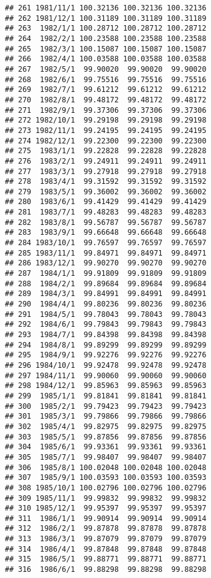 \documentclass[
]{article}
\begin{document}
\begin{verbatim}
## 261 1981/11/1 100.32136 100.32136 100.32136
## 262 1981/12/1 100.31189 100.31189 100.31189
## 263  1982/1/1 100.28712 100.28712 100.28712
## 264  1982/2/1 100.23588 100.23588 100.23588
## 265  1982/3/1 100.15087 100.15087 100.15087
## 266  1982/4/1 100.03588 100.03588 100.03588
## 267  1982/5/1  99.90020  99.90020  99.90020
## 268  1982/6/1  99.75516  99.75516  99.75516
## 269  1982/7/1  99.61212  99.61212  99.61212
## 270  1982/8/1  99.48172  99.48172  99.48172
## 271  1982/9/1  99.37306  99.37306  99.37306
## 272 1982/10/1  99.29198  99.29198  99.29198
## 273 1982/11/1  99.24195  99.24195  99.24195
## 274 1982/12/1  99.22300  99.22300  99.22300
## 275  1983/1/1  99.22828  99.22828  99.22828
## 276  1983/2/1  99.24911  99.24911  99.24911
## 277  1983/3/1  99.27918  99.27918  99.27918
## 278  1983/4/1  99.31592  99.31592  99.31592
## 279  1983/5/1  99.36002  99.36002  99.36002
## 280  1983/6/1  99.41429  99.41429  99.41429
## 281  1983/7/1  99.48283  99.48283  99.48283
## 282  1983/8/1  99.56787  99.56787  99.56787
## 283  1983/9/1  99.66648  99.66648  99.66648
## 284 1983/10/1  99.76597  99.76597  99.76597
## 285 1983/11/1  99.84971  99.84971  99.84971
## 286 1983/12/1  99.90270  99.90270  99.90270
## 287  1984/1/1  99.91809  99.91809  99.91809
## 288  1984/2/1  99.89684  99.89684  99.89684
## 289  1984/3/1  99.84991  99.84991  99.84991
## 290  1984/4/1  99.80236  99.80236  99.80236
## 291  1984/5/1  99.78043  99.78043  99.78043
## 292  1984/6/1  99.79843  99.79843  99.79843
## 293  1984/7/1  99.84398  99.84398  99.84398
## 294  1984/8/1  99.89299  99.89299  99.89299
## 295  1984/9/1  99.92276  99.92276  99.92276
## 296 1984/10/1  99.92478  99.92478  99.92478
## 297 1984/11/1  99.90060  99.90060  99.90060
## 298 1984/12/1  99.85963  99.85963  99.85963
## 299  1985/1/1  99.81841  99.81841  99.81841
## 300  1985/2/1  99.79423  99.79423  99.79423
## 301  1985/3/1  99.79866  99.79866  99.79866
## 302  1985/4/1  99.82975  99.82975  99.82975
## 303  1985/5/1  99.87856  99.87856  99.87856
## 304  1985/6/1  99.93361  99.93361  99.93361
## 305  1985/7/1  99.98407  99.98407  99.98407
## 306  1985/8/1 100.02048 100.02048 100.02048
## 307  1985/9/1 100.03593 100.03593 100.03593
## 308 1985/10/1 100.02796 100.02796 100.02796
## 309 1985/11/1  99.99832  99.99832  99.99832
## 310 1985/12/1  99.95397  99.95397  99.95397
## 311  1986/1/1  99.90914  99.90914  99.90914
## 312  1986/2/1  99.87878  99.87878  99.87878
## 313  1986/3/1  99.87079  99.87079  99.87079
## 314  1986/4/1  99.87848  99.87848  99.87848
## 315  1986/5/1  99.88771  99.88771  99.88771
## 316  1986/6/1  99.88298  99.88298  99.88298

\end{verbatim}
\end{document}
